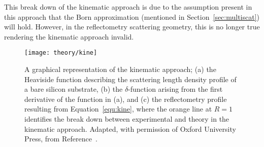 This break down of the kinematic approach is due to the assumption present in this approach that the Born approximation (mentioned in Section~\ref{sec:multiscat}) will hold.
However, in the reflectometry scattering geometry, this is no longer true rendering the kinematic approach invalid.
%
\begin{figure}
    \centering
    \texttt{[image: theory/kine]}
    \caption{A graphical representation of the kinematic approach; (a) the Heaviside function describing the scattering length density profile of a bare silicon substrate, (b) the $\delta$-function arising from the first derivative of the function in (a), and (c) the reflectometry profile resulting from Equation~\ref{equ:kine}, where the orange line at $R=1$ identifies the break down between experimental and theory in the kinematic approach. Adapted, with permission of Oxford University Press\textsuperscript{\textcopyright}, from Reference~\cite{sivia_elementary_2011}.}
    \label{fig:kine}
\end{figure}
%

